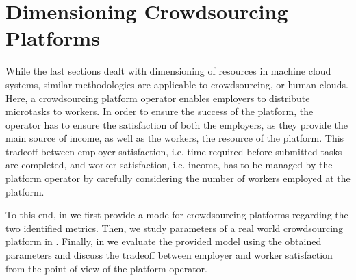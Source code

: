 \section{Dimensioning Crowdsourcing Platforms}\label{sec:cloud:crowdsourcing}
\newcommand{\campaignIAT}{\ensuremath{A_C}\xspace}
\newcommand{\campaignSize}{\ensuremath{\Theta}\xspace}
\newcommand{\taskDuration}{\ensuremath{B}\xspace}
\newcommand{\meanTaskLength}{\ensuremath{E[B]}\xspace}
\newcommand{\numberOfWorkers}{\ensuremath{c}\xspace}
\newcommand{\workerUtilization}{\ensuremath{\rho}\xspace}
\newcommand{\campaignDuration}{\ensuremath{\delta}\xspace}
\newcommand{\preTaskProcessingDelay}{\ensuremath{E[D]}\xspace}
While the last sections dealt with dimensioning of resources in machine cloud systems, similar methodologies are applicable to crowdsourcing, or human-clouds.
Here, a crowdsourcing platform operator enables employers to distribute microtasks to workers.
In order to ensure the success of the platform, the operator has to ensure the satisfaction of both the employers, as they provide the main source of income, as well as the workers, the resource of the platform.
This tradeoff between employer satisfaction, i.e. time required before submitted tasks are completed, and worker satisfaction, i.e. income, has to be managed by the platform operator by carefully considering the number of workers employed at the platform.

To this end, in  we first provide a mode for crowdsourcing platforms regarding the two identified metrics.
Then, we study parameters of a real world crowdsourcing platform in .
Finally, in  we evaluate the provided model using the obtained parameters and discuss the tradeoff between employer and worker satisfaction from the point of view of the platform operator.



